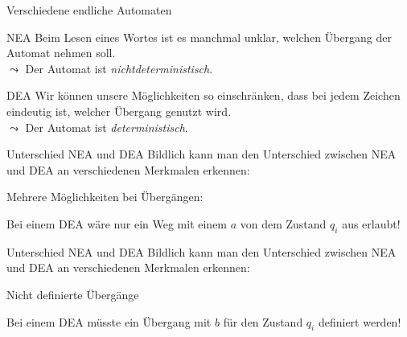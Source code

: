 \begin{frame}[fragile]{Verschiedene endliche Automaten}
    \begin{alertblock}{NEA}
        Beim Lesen eines Wortes ist es manchmal unklar, welchen Übergang der Automat nehmen soll.\\
        $\leadsto$ Der Automat ist \emph{\alert{nichtdeterministisch}}.
    \end{alertblock}
    \begin{alertblock}{DEA}
        Wir können unsere Möglichkeiten so einschränken, dass bei jedem Zeichen eindeutig ist, welcher Übergang genutzt wird.\\
        $\leadsto$ Der Automat ist \alert{\emph{deterministisch}}.
    \end{alertblock}
\end{frame}

\begin{frame}[fragile]{Unterschied NEA und DEA}
    Bildlich kann man den Unterschied zwischen NEA und DEA an verschiedenen Merkmalen erkennen:
    \begin{alertblock}{Mehrere Möglichkeiten bei Übergängen:}
        \begin{center}
        \end{center}
        Bei einem DEA wäre nur ein Weg mit einem \alert{$a$} von dem Zustand $q_i$ aus erlaubt!
    \end{alertblock}
\end{frame}

\begin{frame}[fragile]{Unterschied NEA und DEA}
    Bildlich kann man den Unterschied zwischen NEA und DEA an verschiedenen Merkmalen erkennen:
    \begin{alertblock}{Nicht definierte Übergänge}
        \begin{center}
        \end{center}
        Bei einem DEA müsste ein Übergang mit \alert{$b$} für den Zustand $q_i$ definiert werden!
    \end{alertblock}
\end{frame}


